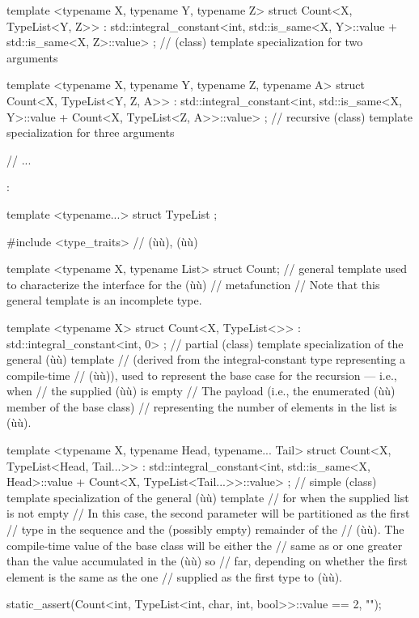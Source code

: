 {{\begin{emcppslisting}[emcppsbatch=e3,style=footcode]
template <typename X, typename Y, typename Z>
struct Count<X, TypeList<Y, Z>>
    : std::integral_constant<int,
        std::is_same<X, Y>::value + std::is_same<X, Z>::value> { };
    // (class) template specialization for two arguments

template <typename X, typename Y, typename Z, typename A>
struct Count<X, TypeList<Y, Z, A>>
    : std::integral_constant<int,
        std::is_same<X, Y>::value + Count<X, TypeList<Z, A>>::value> { };
    // recursive (class) template specialization for three arguments

// ...
\end{emcppslisting}
      }}:

\begin{emcppshiddenlisting}[emcppsbatch=e4]
template <typename...> struct TypeList { };
\end{emcppshiddenlisting}
\begin{emcppslisting}[emcppsbatch=e4,label={relaxedconstexpr-countcode}]
#include <type_traits>  // (ù{}ù), (ù{}ù)

template <typename X, typename List> struct Count;
    // general template used to characterize the interface for the (ù{}ù)
    // metafunction
    // Note that this general template is an incomplete type.

template <typename X>
struct Count<X, TypeList<>> : std::integral_constant<int, 0> { };
    // partial (class) template specialization of the general (ù{}ù) template
    // (derived from the integral-constant type representing a compile-time
    // (ù{}ù)), used to represent the base case for the recursion --- i.e., when
    // the supplied (ù{}ù) is empty 
    // The payload (i.e., the enumerated (ù{}ù) member of the base class) 
    // representing the number of elements in the list is (ù{}ù).

template <typename X, typename Head, typename... Tail>
struct Count<X, TypeList<Head, Tail...>>
    : std::integral_constant<int,
        std::is_same<X, Head>::value + Count<X, TypeList<Tail...>>::value> { };
    // simple (class) template specialization of the general (ù{}ù) template
    // for when the supplied list is not empty 
    // In this case, the second parameter will be partitioned as the first 
    // type in the sequence and the (possibly empty) remainder of the 
    // (ù{}ù). The compile-time value of the base class will be either the 
    // same as or one greater than the value accumulated in the (ù{}ù) so 
    // far, depending on whether the first element is the same as the one 
    // supplied as the first type to (ù{}ù).

static_assert(Count<int, TypeList<int, char, int, bool>>::value == 2, "");
\end{emcppslisting}
    
